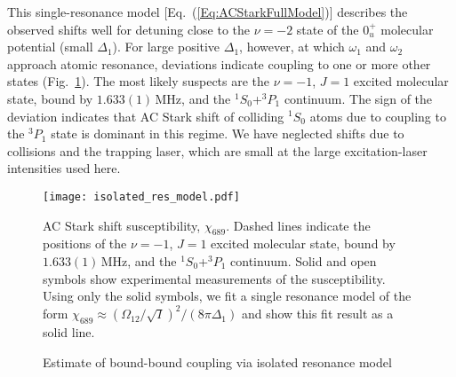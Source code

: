
This single-resonance model [Eq.\ (\ref{Eq:ACStarkFullModel})] describes the observed shifts well for detuning close to the $\nu=-2$ state of the $0^+_u$ molecular potential (small $\Delta_1$). For large positive $\Delta_1$, however, at which $\omega_1$ and $\omega_2$ approach atomic resonance, deviations indicate coupling to one or more other states (Fig.\ \ref{Fig:ACStark}). The most likely suspects are the $\nu=-1$, $J=1$ excited molecular state, bound by $1.633(1)$\,MHz, and the $^1S_0$+$^3P_1$ continuum. The sign of the deviation indicates that AC Stark shift of colliding $^1S_0$ atoms due to coupling to the $^3P_1$ state is dominant in this regime. We have neglected shifts due to collisions and the trapping laser, which are small at the large excitation-laser intensities used here.

\begin{figure} \label{Fig:ACStark}
\centerline{
  \texttt{[image: isolated\_res\_model.pdf]}}
  \caption{Estimate of bound-bound coupling via isolated resonance model}{AC Stark shift susceptibility, $\chi_{689}$. Dashed lines indicate the positions of the $\nu=-1$, $J=1$ excited molecular state, bound by $1.633(1)$\,MHz, and the $^1S_0$+$^3P_1$ continuum. Solid and open symbols show experimental measurements of the susceptibility. Using only the solid symbols, we fit a single resonance model of the form $\chi_{689}\approx(\Omega_{12}/\sqrt{I})^2/(8\pi \Delta_1)$ and show this fit result as a solid line.}
\end{figure}

